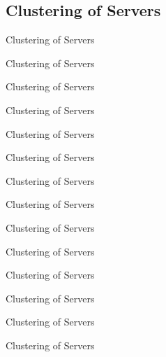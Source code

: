 \documentclass[11pt,a4paper]{article}
\begin{document}
\subsection{Clustering of Servers}
Clustering of Servers


Clustering of Servers


Clustering of Servers


Clustering of Servers


Clustering of Servers


Clustering of Servers


Clustering of Servers


Clustering of Servers


Clustering of Servers


Clustering of Servers


Clustering of Servers


Clustering of Servers


Clustering of Servers


Clustering of Servers
\end{document}
